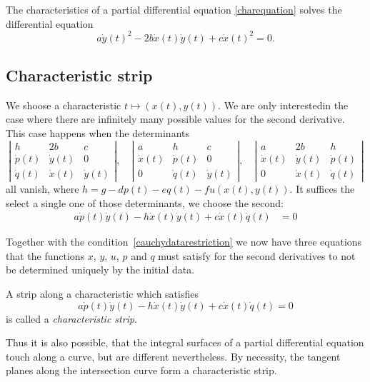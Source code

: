 \begin{satz}
\label{charakteristikendgl}
The characteristics of a partial differential equation
\eqref{charequation}
solves the differential equation
\[
a\dot y(t)^2-2b\dot x(t)\dot y(t)+c\dot x(t)^2=0.
\]
\end{satz}

\subsection{Characteristic strip}
We shoose a characteristic $t\mapsto(x(t),y(t))$.
We are only interestedin the case where there are infinitely
many possible values for the second derivative.
This case happens when the determinants
\[
\left|
\begin{matrix}
h&2b&c\\
\dot p(t)&\dot y(t)&0\\
\dot q(t)&\dot x(t)&\dot y(t)
\end{matrix}
\right|
,
\quad
\left|
\begin{matrix}
a&h&c\\
\dot x(t)&\dot p(t)&0\\
0&\dot q(t)&\dot y(t)
\end{matrix}
\right|
,
\quad
\left|
\begin{matrix}
a&2b&h\\
\dot x(t)&\dot y(t)&\dot p(t)\\
0&\dot x(t)&\dot q(t)
\end{matrix}
\right|
\]
all vanish, where $h=g-dp(t)-eq(t)-fu(x(t),y(t))$.
It suffices the select a single one of those determinants,
we choose the second:
\begin{align*}
a\dot p(t)\dot y(t)-h\dot x(t)\dot y(t)+c\dot x(t)\dot q(t)&=0
\end{align*}

Together with the condition~\eqref{cauchydatarestriction}
we now have three equations that the functions
$x$, $y$, $u$, $p$ and $q$ must satisfy for the second
derivatives to not be determined uniquely by the initial data.

\begin{definition}
A strip along a characteristic which satisfies
\[
a\dot p(t)\dot y(t)-h\dot x(t)\dot y(t)+c\dot x(t)\dot q(t)=0
\]
is called a {\em characteristic strip}.
\end{definition}

Thus it is also possible, that the integral surfaces of a partial
differential equation touch along a curve, but are different
nevertheless.
By necessity, the tangent planes along the intersection curve form
a characteristic strip.

